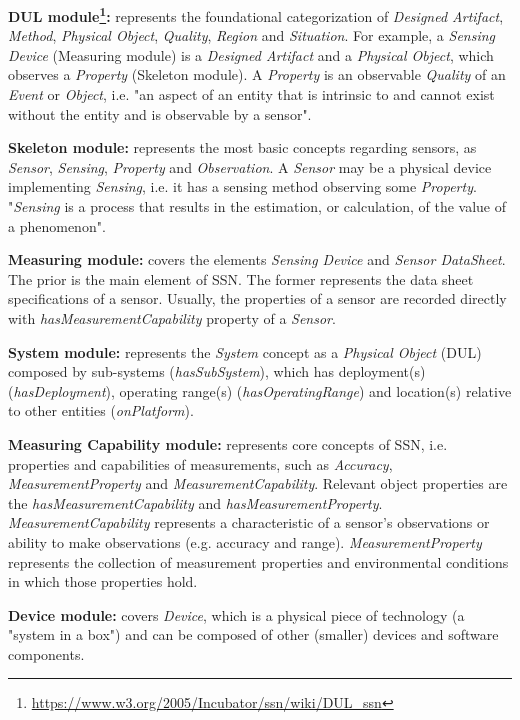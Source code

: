 \documentclass{sig-alternate-05-2015}
\begin{document}
\noindent
\textbf{DUL module\footnote{\url{https://www.w3.org/2005/Incubator/ssn/wiki/DUL_ssn}}:} represents the foundational categorization of \textit{Designed Artifact}, \textit{Method}, \textit{Physical Object}, \textit{Quality}, \textit{Region} and \textit{Situation}. For example, a \textit{Sensing Device} (Measuring module) is a \textit{Designed Artifact} and a \textit{Physical Object}, which observes a \textit{Property} (Skeleton module). A \textit{Property} is an observable \textit{Quality} of an \textit{Event} or \textit{Object}, i.e. "an aspect of an entity that is intrinsic to and cannot exist without the entity and is observable by a sensor". 

\noindent
\textbf{Skeleton module:} represents the most basic concepts regarding sensors, as \textit{Sensor}, \textit{Sensing}, \textit{Property} and  \textit{Observation}. A \textit{Sensor} may be a physical device implementing \textit{Sensing}, i.e. it has a sensing method observing some \textit{Property}. "\textit{Sensing} is a process that results in the estimation, or calculation, of the value of a phenomenon". 

\noindent
\textbf{Measuring module:} covers the elements \textit{Sensing Device} and \textit{Sensor DataSheet}. The prior is the main element of SSN. The former represents the data sheet specifications of a sensor. Usually, the properties of a sensor are recorded directly with \textit{hasMeasurementCapability} property of a \textit{Sensor}.

\noindent
\textbf{System module:} represents the \textit{System} concept as a \textit{Physical Object} (DUL) composed by sub-systems (\textit{hasSubSystem}), which has deployment(s) (\textit{hasDeployment}), operating range(s) (\textit{hasOperatingRange}) and location(s) relative to other entities (\textit{onPlatform}).

\noindent
\textbf{Measuring Capability module:} represents core concepts of SSN, i.e. properties and capabilities of measurements, such as \textit{Accuracy}, \textit{MeasurementProperty} and \textit{MeasurementCapability}. Relevant object properties are the \textit{hasMeasurementCapability} and \textit{hasMeasurementProperty}. \textit{MeasurementCapability} represents a characteristic of a sensor's observations or ability to make observations (e.g. accuracy and range). \textit{MeasurementProperty} represents the collection of measurement properties and environmental conditions in which those properties hold.  

\noindent
\textbf{Device module:} covers \textit{Device}, which is a physical piece of technology (a "system in a box") and can be composed of other (smaller) devices and software components.
\end{document}
